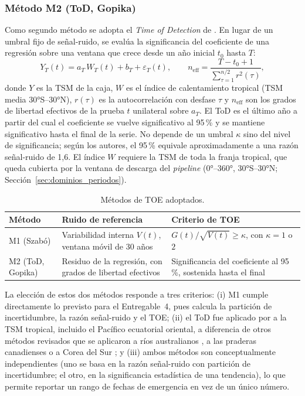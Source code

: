 \subsubsection{Método M2 (ToD, Gopika)}

Como segundo método se adopta el \emph{Time of Detection} de \citet{gopika2024}. En lugar de un umbral fijo de señal-ruido, se evalúa la significancia del coeficiente de una regresión sobre una ventana que crece desde un año inicial $t_0$ hasta $T$:
\begin{equation}
\label{eq:tod}
Y_T(t) = a_T\,W_T(t) + b_T + \varepsilon_T(t), \qquad n_{\text{eff}} = \frac{T-t_0+1}{\sum_{\tau=1}^{n/2} r^2(\tau)},
\end{equation}
donde $Y$ es la TSM de la caja, $W$ es el índice de calentamiento tropical (TSM media 30°S--30°N), $r(\tau)$ es la autocorrelación con desfase $\tau$ y $n_{\text{eff}}$ son los grados de libertad efectivos de la prueba $t$ unilateral sobre $a_T$. El ToD es el último año a partir del cual el coeficiente se vuelve significativo al 95\,\% y se mantiene significativo hasta el final de la serie. No depende de un umbral $\kappa$ sino del nivel de significancia; según los autores, el 95\,\% equivale aproximadamente a una razón señal-ruido de 1{,}6. El índice $W$ requiere la TSM de toda la franja tropical, que queda cubierta por la ventana de descarga del \emph{pipeline} (0°--360°, 30°S--30°N; Sección~\ref{sec:dominios_periodos}).

\begin{table}[htbp]
\caption{Métodos de TOE adoptados.}
\label{tab:metodos_toe}
\small
\begin{tabular}{@{}L{2.3cm}L{5.6cm}L{\dimexpr\textwidth-2.3cm-5.6cm-4\tabcolsep\relax}@{}}
\toprule
\textbf{Método} & \textbf{Ruido de referencia} & \textbf{Criterio de TOE} \\
\midrule
M1 (Szabó) & Variabilidad interna $V(t)$, ventana móvil de 30 años & $G(t)/\sqrt{V(t)} \geq \kappa$, con $\kappa=1$ o $2$ \\
M2 (ToD, Gopika) & Residuo de la regresión, con grados de libertad efectivos & Significancia del coeficiente al 95\,\%, sostenida hasta el final \\
\bottomrule
\end{tabular}
\end{table}

La elección de estos dos métodos responde a tres criterios: (i) M1 cumple directamente lo previsto para el Entregable~4, pues calcula la partición de incertidumbre, la razón señal-ruido y el TOE; (ii) el ToD fue aplicado por \citet{gopika2024} a la TSM tropical, incluido el Pacífico ecuatorial oriental, a diferencia de otros métodos revisados que se aplicaron a ríos australianos \citep{john2023}, a las praderas canadienses \citep{barrow2019} o a Corea del Sur \citep{ryu2024}; y (iii) ambos métodos son conceptualmente independientes (uno se basa en la razón señal-ruido con partición de incertidumbre; el otro, en la significancia estadística de una tendencia), lo que permite reportar un rango de fechas de emergencia en vez de un único número.
